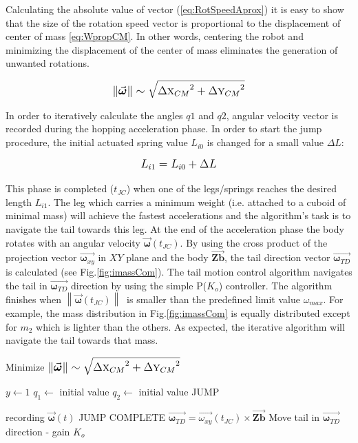 Calculating the absolute value of vector (\ref{eq:RotSpeedAprox}) it is easy to show that the size of the rotation speed vector is proportional to the displacement of center of mass \eqref{eq:WpropCM}. In other words, centering the robot and minimizing the displacement of the center of mass eliminates the generation of unwanted rotations. 

\begin{equation}\label{eq:WpropCM}
\left \| \vec{\boldsymbol{\omega}} \right \|\sim \sqrt{{\Delta \textsc{x}_{CM}}^2+{\Delta \textsc{y}_{CM}}^2}
\end{equation}


In order to iteratively calculate the angles $q1$ and $q2$, angular velocity vector is recorded during the hopping acceleration phase. In order to start the jump procedure, the initial actuated spring value $L_{i0}$ is changed for a small value $\Delta L$:

\begin{equation}
\tiny
L_{i1}=L_{i0}+\Delta L
\normalsize
\end{equation}  

This phase is completed ($t_{JC}$) when one of the legs/springs reaches the desired length $L_{i1}$. The leg which carries a minimum weight (i.e. attached to a cuboid of minimal mass) will achieve the fastest accelerations and the algorithm’s task is to navigate the tail towards this leg. At the end of the acceleration phase the body rotates with an angular velocity $\vec{\boldsymbol{\omega}}(t_{JC})$. By using the cross product of the projection vector $\vec{\boldsymbol{\omega}_{xy}}$ in $XY$ plane and the body $\vec{\boldsymbol{Zb}}$, the tail direction vector $\vec{\boldsymbol{\omega}_{TD}}$ is calculated (see Fig.\ref{fig:imassCom}). The tail motion control algorithm navigates the tail in $\vec{\boldsymbol{\omega}_{TD}}$ direction by using the simple P($K_o$) controller. The algorithm finishes when $\left \| \vec{\boldsymbol{\omega}}(t_{JC}) \right \|\ $ is smaller than the  predefined limit value $\omega_{max}$.  For example, the mass distribution in Fig.\ref{fig:imassCom} is equally distributed except for $m_2$  which is lighter than the others. As expected, the iterative algorithm will navigate the tail towards that mass.



\begin{algorithm}
\caption{Minimize $\left \| \vec{\boldsymbol{\omega}} \right \|\sim \sqrt{{\Delta \textsc{x}_{CM}}^2+{\Delta \textsc{y}_{CM}}^2}$}
\begin{algorithmic} 
\STATE $y \leftarrow 1$
\REPEAT
\STATE $q_1 \leftarrow$ initial value
\STATE $q_2 \leftarrow$ initial value
\STATE JUMP

\REPEAT
\STATE recording $\vec{\boldsymbol{\omega}}(t)$
\UNTIL JUMP COMPLETE
\STATE $\vec{\boldsymbol{\omega}_{TD}} = \vec{\omega_{xy}}(t_{JC}) \times \vec{\boldsymbol{Zb}}$
\STATE Move tail in $\vec{\boldsymbol{\omega}_{TD}}$ direction - gain $K_o$
\end{algorithmic}
\end{algorithm}



